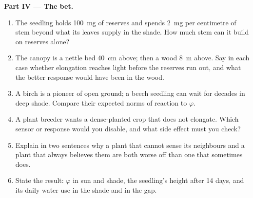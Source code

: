 \begin{problem}
\medskip
\noindent\textbf{Part IV --- The bet.}
\begin{enumerate}[resume]
  \item The seedling holds \qty{100}{mg} of reserves and spends
        \qty{2}{mg} per centimetre of stem beyond what its leaves
        supply in the shade. How much stem can it build on reserves
        alone?
  \item The canopy is a nettle bed \qty{40}{cm} above; then a wood
        \qty{8}{m} above. Say in each case whether elongation reaches
        light before the reserves run out, and what the better
        response would have been in the wood.
  \item A birch is a pioneer of open ground; a beech seedling can
        wait for decades in deep shade. Compare their expected norms
        of reaction to $\varphi$.
  \item A plant breeder wants a dense-planted crop that does not
        elongate. Which sensor or response would you disable, and
        what side effect must you check?
  \item Explain in two sentences why a plant that cannot sense its
        neighbours and a plant that always believes them are both
        worse off than one that sometimes does.
  \item State the result: $\varphi$ in sun and shade, the seedling's
        height after 14 days, and its daily water use in the shade
        and in the gap.
\end{enumerate}
\end{problem}
